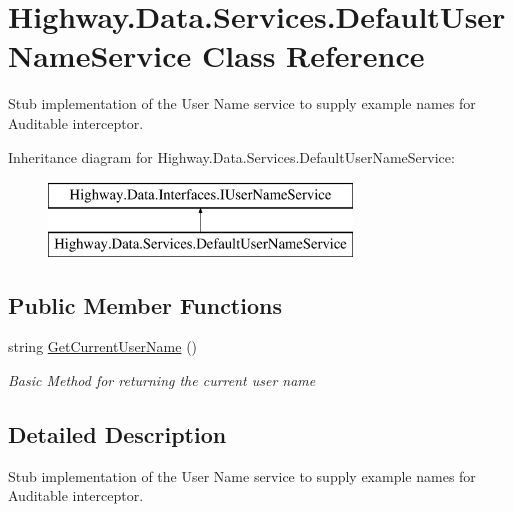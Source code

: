 \hypertarget{class_highway_1_1_data_1_1_services_1_1_default_user_name_service}{\section{Highway.\-Data.\-Services.\-Default\-User\-Name\-Service Class Reference}
\label{class_highway_1_1_data_1_1_services_1_1_default_user_name_service}
}


Stub implementation of the User Name service to supply example names for Auditable interceptor.  


Inheritance diagram for Highway.\-Data.\-Services.\-Default\-User\-Name\-Service\-:\begin{figure}[H]
\begin{center}
\leavevmode
\includegraphics[height=2.000000cm]{class_highway_1_1_data_1_1_services_1_1_default_user_name_service}
\end{center}
\end{figure}
\subsection*{Public Member Functions}
\begin{DoxyCompactItemize}
\item 
string \hyperlink{class_highway_1_1_data_1_1_services_1_1_default_user_name_service_a58828bf30490a5dc67049d2dc77da0c3}{Get\-Current\-User\-Name} ()
\begin{DoxyCompactList}\small\item\em Basic Method for returning the current user name \end{DoxyCompactList}\end{DoxyCompactItemize}


\subsection{Detailed Description}
Stub implementation of the User Name service to supply example names for Auditable interceptor. 




